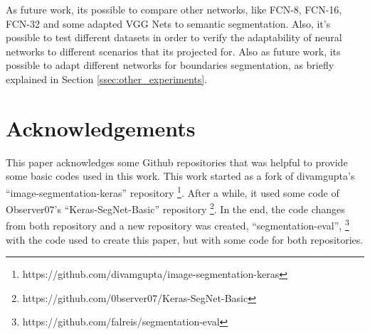 \documentclass[10pt,twocolumn,letterpaper]{article}
\begin{document}
As future work, its possible to compare other networks, like FCN-8, FCN-16, FCN-32 \cite{FULLY_CONVOLU} and some adapted VGG Nets \cite{VGGNET} to semantic segmentation. Also, it's possible to test different datasets in order to verify the adaptability of neural networks to different scenarios that its projected for. Also as future work, its possible to adapt different networks for boundaries segmentation, as briefly explained in Section \ref{ssec:other_experiments}.

\section{Acknowledgements} \label{sec:acknowledgements}

This paper acknowledges some Github repositories that was helpful to provide some basic codes used in this work. This work started as a fork of divamgupta's ``image-segmentation-keras'' repository \footnote{https://github.com/divamgupta/image-segmentation-keras}. After a while, it used some code of Observer07's ``Keras-SegNet-Basic'' repository \footnote{https://github.com/0bserver07/Keras-SegNet-Basic}. In the end, the code changes from both repository and a new repository was created, ``segmentation-eval'', \footnote{https://github.com/falreis/segmentation-eval} with the code used to create this paper, but with some code for both repositories.

{\small


}
\end{document}
